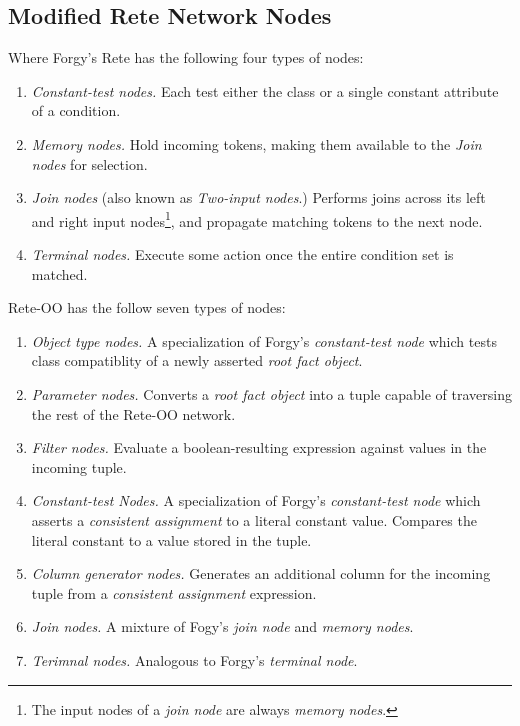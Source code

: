 \documentclass[10pt,twocolumn,letterpaper,colorhighlight]{article}
\begin{document}
\subsection{Modified Rete Network Nodes}

Where Forgy's Rete has the following four types of nodes:

	\begin{enumerate}
		\item \emph{Constant-test nodes.} Each test either the class
					or a single constant attribute of a condition.
		\item \emph{Memory nodes.} Hold incoming tokens, making them 
					available to the \emph{Join nodes} for selection.
		\item \emph{Join nodes} (also known as \emph{Two-input nodes}.)
					Performs joins across its left and right input
					nodes\footnote{The input nodes of a \emph{join
					node} are always \emph{memory nodes}.}, and 
					propagate matching tokens to the next node.
		\item \emph{Terminal nodes.} Execute some action once the
					entire condition set is matched.
	\end{enumerate}

Rete-OO has the follow seven types of nodes:

	\begin{enumerate}
		\item \emph{Object type nodes.} A specialization of Forgy's
				\emph{constant-test node} which tests class compatiblity
				of a newly asserted \emph{root fact object}.
		\item \emph{Parameter nodes.} Converts a \emph{root fact
				object} into a tuple capable of traversing the rest
				of the Rete-OO network.
		\item \emph{Filter nodes.} Evaluate a boolean-resulting
				expression against values in the incoming tuple.
		\item \emph{Constant-test Nodes.} A specialization of
				Forgy's \emph{constant-test node} which asserts
				a \emph{consistent assignment} to a literal 
				constant value.  Compares the literal constant to
				a value stored in the tuple.
		\item \emph{Column generator nodes.} Generates an additional
				column for the incoming tuple from a \emph{consistent
				assignment} expression.
		\item \emph{Join nodes.} A mixture of Fogy's \emph{join node}
				and \emph{memory nodes}.  
		\item \emph{Terimnal nodes.} Analogous to Forgy's
				\emph{terminal node}.
	\end{enumerate}
\end{document}
